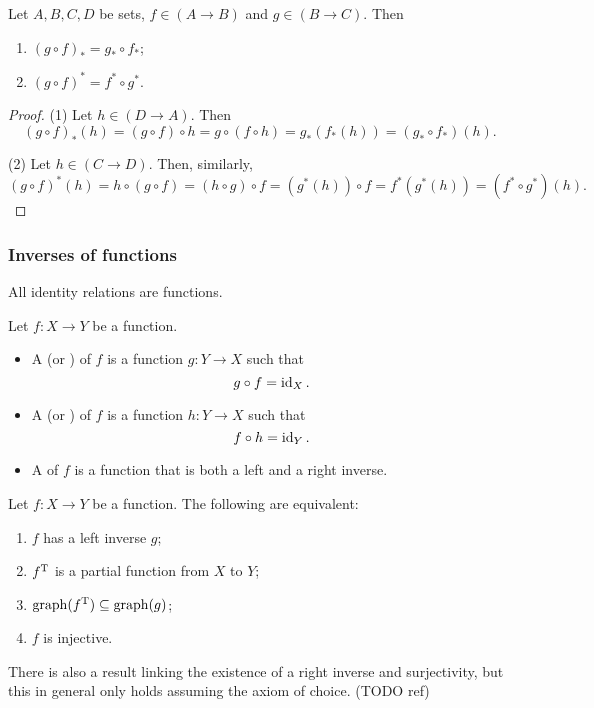 \begin{lemma} \label{covarianceContravarianceComposition}
Let $A,B,C, D$ be sets, $f\in (A\to B)$ and $g\in(B\to C)$. Then
\begin{enumerate}
\item $(g\circ f)_* = g_*\circ f_*$;
\item $(g\circ f)^* = f^*\circ g^*$.
\end{enumerate}
\end{lemma}
\begin{proof}
(1) Let $h\in (D\to A)$. Then
\[(g\circ f)_*(h) = (g\circ f)\circ h = g\circ(f\circ h) = g_*(f_*(h)) = (g_*\circ f_*)(h). \]

(2) Let $h\in (C\to D)$. Then, similarly, 
\[ (g\circ f)^*(h) = h\circ (g\circ f) = (h\circ g)\circ f = (g^*(h))\circ f = f^*(g^*(h)) = (f^*\circ g^*)(h). \]
\end{proof}

\subsubsection{Inverses of functions}
All identity relations are functions.

\begin{definition}
Let $f:X\to Y$ be a function.
\begin{itemize}
\item A  (or ) of $f$ is a function $g: Y\to X$ such that
\[ g\circ f = \operatorname{id}_X. \]
\item A  (or ) of $f$ is a function $h: Y\to X$ such that
\[ f\circ h = \operatorname{id}_Y. \]
\item A  of $f$ is a function that is both a left and a right inverse.
\end{itemize}
\end{definition}

\begin{lemma} \label{injectiveInverse}
Let $f:X\to Y$ be a function. The following are equivalent:
\begin{enumerate}
\item $f$ has a left inverse $g$;
\item $f^{\mathrm{T}}$ is a partial function from $X$ to $Y$; 
\item $\operatorname{graph}(f^{\mathrm{T}}) \subseteq \operatorname{graph}(g)$;
\item $f$ is injective.
\end{enumerate}
\end{lemma}
There is also a result linking the existence of a right inverse and surjectivity, but this in general only holds assuming the axiom of choice. (TODO ref)

